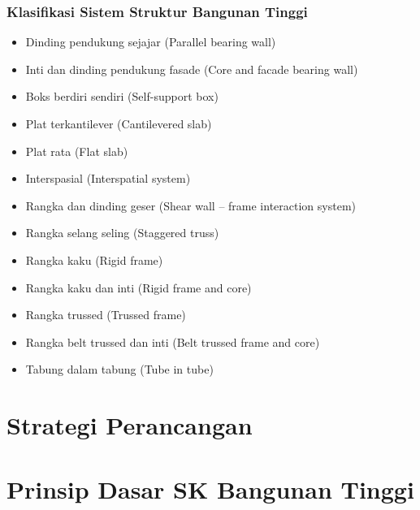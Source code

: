 \documentclass[../skb.tex]{subfiles}
\begin{document}
\begin{frame}[t,mycolor=digiPH_gray,mytitle=standard,light]
	\frametitle{Klasifikasi Sistem Struktur Bangunan Tinggi}

	\begin{itemize}

		\item Dinding pendukung sejajar (Parallel bearing wall)
		\item Inti dan dinding pendukung fasade (Core and facade bearing wall)
		\item Boks berdiri sendiri (Self-support box)
		\item Plat terkantilever (Cantilevered slab)
		\item Plat rata (Flat slab)
		\item Interspasial (Interspatial system)
		\item Rangka dan dinding geser (Shear wall – frame interaction system)
		\item Rangka selang seling (Staggered truss)
		\item Rangka kaku (Rigid frame)
		\item Rangka kaku dan inti (Rigid frame and core)
		\item Rangka trussed (Trussed frame)
		\item Rangka belt trussed dan inti (Belt trussed frame and core)
		\item Tabung dalam tabung (Tube in tube)

	\end{itemize}

\end{frame}

\section{Strategi Perancangan}%
\label{sec:Strategi Perancangan}

\begin{frame}[c,mybg=pg_6_1,mytitle=standard,dark] \end{frame}
\begin{frame}[c,mybg=pg_6_2,mytitle=standard,dark] \end{frame}
\begin{frame}[c,mybg=pg_6_3,mytitle=standard,dark] \end{frame}

\section{Prinsip Dasar SK Bangunan Tinggi}%
\label{sec:Prinsip Dasar SK Bangunan Tinggi}
\end{document}
